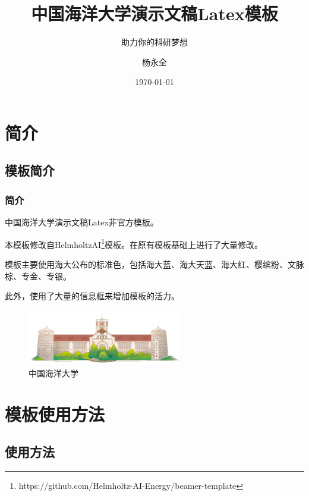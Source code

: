 \documentclass[aspectratio=169,UTF8,t]{beamer}%
\title{中国海洋大学演示文稿Latex模板}
\subtitle{助力你的科研梦想}
\author{杨永全}
\date{\today}
\institute{计算机科学与技术学院}
\begin{document}
\maketitle

\makeoutline

\section{简介}

\subsection{模板简介}

\begin{frame}
    \frametitle{简介}
    中国海洋大学演示文稿Latex非官方模板。

    本模板修改自HelmholtzAI\footnote{https://github.com/Helmholtz-AI-Energy/beamer-template}模板。在原有模板基础上进行了大量修改。

    模板主要使用海大公布的标准色，包括海大蓝、海大天蓝、海大红、樱缤粉、文脉棕、专金、专银。

    此外，使用了大量的信息框来增加模板的活力。
    \begin{center}
        \begin{figure}
        \centering
        \includegraphics[width=0.6\textwidth]{figs/ouc.png}
            \caption{中国海洋大学}
            \label{fig:ouc}
        \end{figure}
    \end{center}
    
    
\end{frame}

\section{模板使用方法}

\subsection{使用方法}
\end{document}
